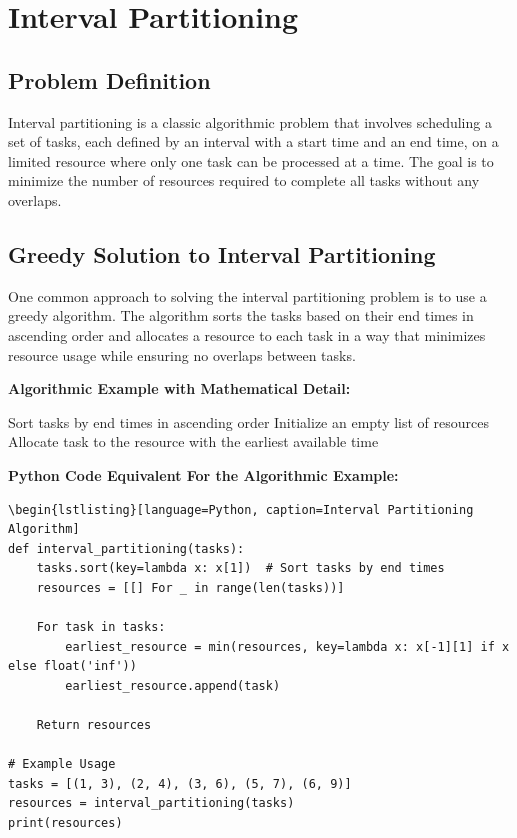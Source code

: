 \documentclass[12pt]{book} %
\begin{document}
\section{Interval Partitioning}
\subsection{Problem Definition}
Interval partitioning is a classic algorithmic problem that involves scheduling a set of tasks, each defined by an interval with a start time and an end time, on a limited resource where only one task can be processed at a time. The goal is to minimize the number of resources required to complete all tasks without any overlaps.

\subsection{Greedy Solution to Interval Partitioning}
One common approach to solving the interval partitioning problem is to use a greedy algorithm. The algorithm sorts the tasks based on their end times in ascending order and allocates a resource to each task in a way that minimizes resource usage while ensuring no overlaps between tasks.

\textbf{Algorithmic Example with Mathematical Detail:}
\FloatBarrier

\begin{algorithm}
\caption{Interval Partitioning Algorithm}
\begin{algorithmic}
\State Sort tasks by end times in ascending order
\State Initialize an empty list of resources
    \State Allocate task to the resource with the earliest available time
\EndFor
\end{algorithmic}
\end{algorithm}
\FloatBarrier
\textbf{Python Code Equivalent For the Algorithmic Example:}
\FloatBarrier
\begin{lstlisting}
\begin{lstlisting}[language=Python, caption=Interval Partitioning Algorithm]
def interval_partitioning(tasks):
    tasks.sort(key=lambda x: x[1])  # Sort tasks by end times
    resources = [[] For _ in range(len(tasks))]
    
    For task in tasks:
        earliest_resource = min(resources, key=lambda x: x[-1][1] if x else float('inf'))
        earliest_resource.append(task)
    
    Return resources
    
# Example Usage
tasks = [(1, 3), (2, 4), (3, 6), (5, 7), (6, 9)]
resources = interval_partitioning(tasks)
print(resources)
\end{lstlisting}
\end{document}
